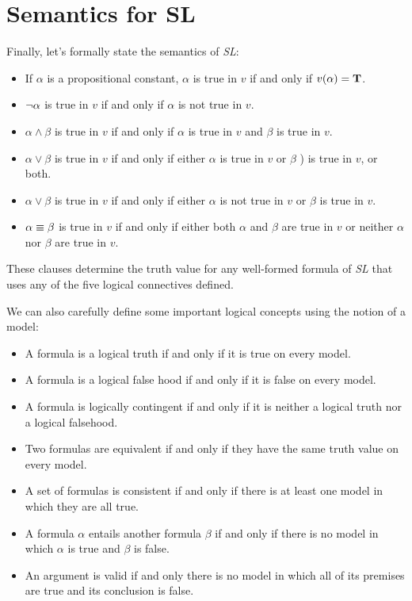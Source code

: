 \documentclass[../logic-text.tex]{subfiles}
\begin{document}
\section{Semantics for SL}
\label{sec:semantics-sl}

Finally, let's formally state the semantics of \emph{SL}:

\begin{itemize}
  \item If \(\alpha\) is a propositional constant, \(\alpha\) is true in \(v\) if and only if \(v(\alpha) = \textbf{T}\).
  \item \(\neg \alpha\) is true in \(v\) if and only if \(\alpha\) is not true in \(v\).
  \item \(\alpha \land \beta\) is true in \(v\) if and only if \(\alpha\) is true in \(v\) and \(\beta\) is true in \(v\).
  \item \(\alpha \lor \beta\) is true in \(v\) if and only if either \(\alpha\) is true in \(v\) or \(\beta\) ) is true in \(v\), or both.
  \item \(\alpha \lor \beta\) is true in \(v\) if and only if either \(\alpha\) is not true in \(v\) or \(\beta\) is true in \(v\).
  \item \(\alpha \equiv \beta\) is true in \(v\) if and only if either both \(\alpha\) and \(\beta\) are true in \(v\) or neither  \(\alpha\) nor \(\beta\) are true in \(v\).
\end{itemize}


These clauses determine the truth value for any well-formed formula of \emph{SL} that uses any of the five logical connectives defined.

We can also carefully define some important logical concepts using the notion of a model:

\begin{itemize}
  \item A formula is a logical truth if and only if it is true on every model.
  \item A formula is a logical false hood if and only if it is false on every model.
  \item A formula is logically contingent if and only if it is neither a logical truth nor a logical falsehood.
  \item Two formulas are equivalent if and only if they have the same truth value on every model.
  \item A set of formulas is consistent if and only if there is at least one model in which they are all true.
  \item A formula \(\alpha\) entails another formula \(\beta\) if and only if there is no model in which \(\alpha\) is true and \(\beta\) is false.
  \item An argument is valid if and only there is no model in which all of its premises are true and its conclusion is false.
\end{itemize}
\end{document}
